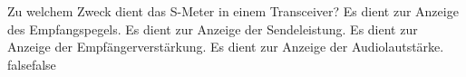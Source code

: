     {Zu welchem Zweck dient das S-Meter in einem Transceiver?}
    {Es dient zur Anzeige des Empfangspegels.}
    {Es dient zur Anzeige der Sendeleistung.}
    {Es dient zur Anzeige der Empfängerverstärkung.}
    {Es dient zur Anzeige der Audiolautstärke.}
    {false}{false}